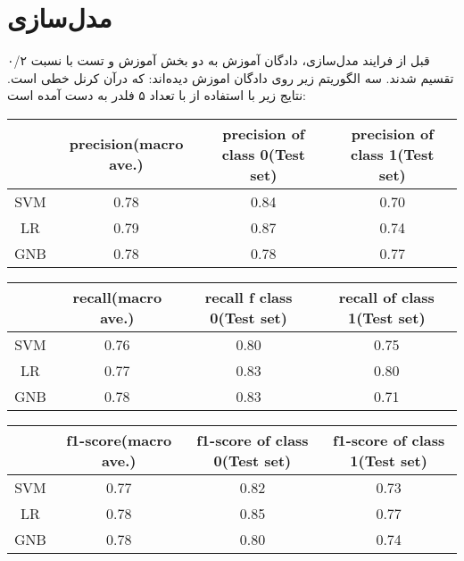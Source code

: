 \documentclass[11pt]{article}
\begin{document}
\section{مدل‌سازی}\label{modeling}
قبل از فرایند مدل‌سازی، دادگان آموزش به دو بخش آموزش و تست با نسبت ۰/۲ تقسیم  شدند. سه الگوریتم زیر روی دادگان اموزش دیده‌اند:
که درآن کرنل
 	خطی است.
نتایج زیر با استفاده از 
	با تعداد ۵ فلدر به دست آمده است:
\begin{latin}
	\begin{table}[h]
		\parbox{\linewidth}{
		\begin{center}
		\begin{tabular}{|c|c|c|c|}
			\hline
			& precision(macro ave.)&precision of class 0(Test set)& precision of class 1(Test set)\\
			\hline
			SVM & 0.78 & 0.84 & 0.70\\
			LR & 0.79 & 0.87 & 0.74\\
			GNB & 0.78 & 0.78 & 0.77\\
			\hline
		\end{tabular}
		\end{center}
		}
		\parbox{\linewidth}{
		\begin{center}
		\begin{tabular}{|c|c|c|c|}
		\hline
		& recall(macro ave.) & recall f class 0(Test set) & recall of class 1(Test set)\\
		\hline
		SVM & 0.76 & 0.80 & 0.75\\
		LR & 0.77 & 0.83 & 0.80\\
		GNB & 0.78 & 0.83 & 0.71\\
		\hline
		\end{tabular}
		\end{center}
		}
		\parbox{\linewidth}{
		\begin{center}
		\begin{tabular}{|c|c|c|c|}
		\hline
		& f1-score(macro ave.) & f1-score of class 0(Test set) & f1-score of class 1(Test set)\\
		\hline
		SVM & 0.77 & 0.82 & 0.73 \\
		LR & 0.78 & 0.85 & 0.77 \\
		GNB & 0.78 & 0.80 & 0.74 \\

\end{tabular}
\end{center}}
\end{table}
\end{latin}
\end{document}
